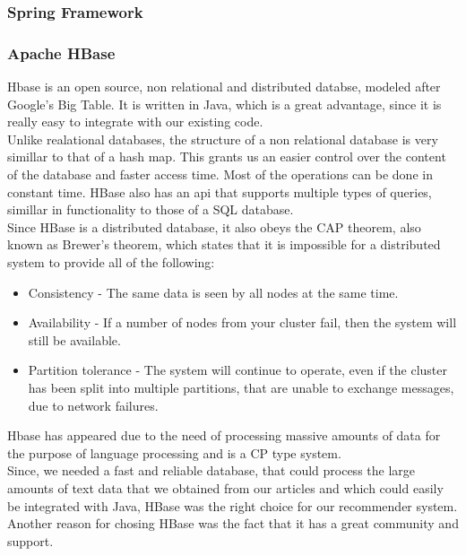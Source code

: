 \subsubsection{Spring Framework}
\label{sec:frameworks-spring-framework}

\subsubsection{Apache HBase}
\label{sec:frameworks-hbase}
Hbase is an open source, non relational and distributed databse, modeled after Google's Big Table. It is written in Java, which is a great advantage, since it is really easy to integrate with our existing code.
\\ Unlike realational databases, the structure of a non relational database is very simillar to that of a hash map. This grants us an easier control over the content of the database and faster access time. Most of the operations can be done in constant time. HBase also has an api that supports multiple types of queries, simillar in functionality to those of a SQL database.
\\ Since HBase is a distributed database, it also obeys the CAP theorem, also known as Brewer's theorem, which states that it is impossible for a distributed system to provide all of the following:

\begin{itemize}
	\item Consistency - The same data is seen by all nodes at the same time.
	\item Availability - If a number of nodes from your cluster fail, then the system will still be available.
	\item Partition tolerance - The system will continue to operate, even if the cluster has been split into multiple partitions, that are unable to exchange messages, due to network failures.
\end{itemize}

Hbase has appeared due to the need of processing massive amounts of data for the purpose of language processing and is a CP type system. 
\\ Since, we needed a fast and reliable database, that could process the large amounts of text data that we obtained from our articles and which could easily be integrated with Java, HBase was the right choice for our recommender system. Another reason for chosing HBase was the fact that it has a great community and support. 

